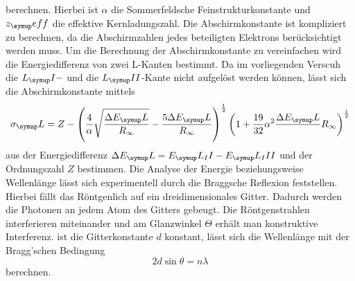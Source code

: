 berechnen. Hierbei ist $\alpha$ die Sommerfeldsche Feinstrukturkonstante und
$z_\su{eff}$ die effektive Kernladungszahl.
Die Abschirmkonstante ist kompliziert zu berechnen, da die Abschirmzahlen
jedes beteiligten Elektrons berücksichtigt werden muss. Um die Berechnung der
Abschirmkonstante zu vereinfachen wird die Energiedifferenz von zwei L-Kanten
bestimmt.
Da im vorliegenden Verscuh die $L_\su{I}-$ und die $L_\su{II}$-Kante nicht
aufgelöst werden können, lässt sich die Abschirmkonstante mittels
\begin{equation}
  \sigma_\su{L}=Z-\left(\frac{4}{\alpha}\sqrt{\frac{\Delta E_\su{L}}{R_\infty}
  }-\frac{5\Delta E_\su{L}}{R_\infty}\right)^{\frac{1}{2}}\left(1+\frac{19}{32}
  \alpha^2\frac{\Delta E_\su{L}}{}R_\infty\right)^{\frac{1}{2}}
  \label{abschirm}
\end{equation}
aus der Energiedifferenz $\Delta E_\su{L}=E_\su{L_II}-E_\su{L_III}$ und der
Ordnungszahl $Z$ bestimmen. Die Analyse der Energie beziehungsweise Wellenlänge
lässt sich experimentell durch die Braggsche Reflexion feststellen. Hierbei
fällt das Röntgenlich auf ein dreidimensionales Gitter. Dadurch werden die
Photonen an jedem Atom des Gitters gebeugt. Die Röntgenstrahlen interferieren
miteinander und am Glanzwinkel $\Theta$ erhält man konstruktive Interferenz.
ist die Gitterkonstante $d$ konstant, lässt sich die Wellenlänge mit der
Bragg'schen Bedingung
\begin{equation}
  2d\sin\theta=n\lambda
  \label{bragg}
\end{equation}
berechnen.
